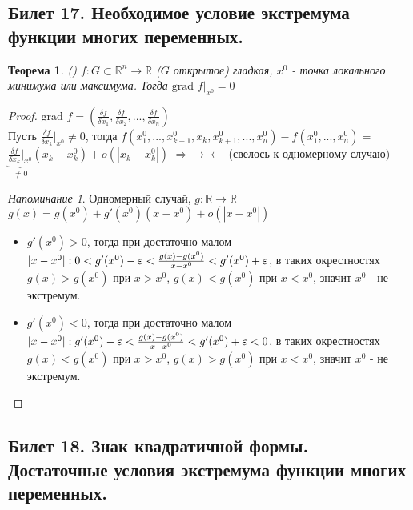 \documentclass[a4paper]{article}
\theoremstyle{indented}
\newtheorem{theorem}{Теорема}
\theoremstyle{definition}
\theoremstyle{remark}
\newtheorem{remind}{Напоминание}
\begin{document}
\subsection{Билет 17. Необходимое условие экстремума функции многих переменных.}


\begin{theorem}()
    $f: G\subset \mathbb{R}^n \to \mathbb{R}$ ($G$ открытое) гладкая, $x^0$ - точка локального минимума или максимума.
    Тогда $\textrm{grad } f\big|_{x^0} = 0$
\end{theorem}

\begin{proof}
    $\textrm{grad } f = \left(\frac{\delta f}{\delta x_1}, \frac{\delta f}{\delta x_2}, ... , \frac{\delta f}{\delta x_n} \right)$\\
    Пусть $\frac{\delta f}{\delta x_k}\big|_{x^0} \not= 0$, тогда
    $f(x^0_1, ..., x^0_{k-1}, x_k, x^0_{k+1}, ... , x^0_n) - f(x^0_1, ... ,x^0_n) = $\\
    $\underbrace{\frac{\delta f}{\delta x_k}\big|_{x^0}}_{\not=0}(x_k-x^0_k) +o(|x_k-x^0_k|)$
    $\Rightarrow \rightarrow\leftarrow$ (свелось к одномерному случаю)
    \begin{remind}
        Одномерный случай, $g: \mathbb{R} \to \mathbb{R}$ \\
        $g(x)=g(x^0)+g'(x^0)(x-x^0)+o(|x-x^0|)$
        \begin{itemize}
            \item $g'(x^0)>0$, тогда при достаточно малом 
            $|x-x^0|: \\ 0 < g'(x^0)-\varepsilon< \frac{g(x)-g(x^0)}{x-x^0} < g'(x^0)+\varepsilon$,
            в таких окрестностях $g(x)>g(x^0)$ при $x>x^0$, $g(x)<g(x^0)$ при $x<x^0$, значит $x^0$ - не экстремум.
            \item $g'(x^0)<0$, тогда при достаточно малом 
            $|x-x^0|: \\ g'(x^0)-\varepsilon< \frac{g(x)-g(x^0)}{x-x^0} < g'(x^0)+\varepsilon < 0$,
            в таких окрестностях $g(x)<g(x^0)$ при $x>x^0$, $g(x)>g(x^0)$ при $x<x^0$, значит $x^0$ - не экстремум.
        \end{itemize}
    \end{remind}
\end{proof}

\subsection{Билет 18. Знак квадратичной формы. Достаточные условия экстремума функции многих переменных.}
\end{document}
